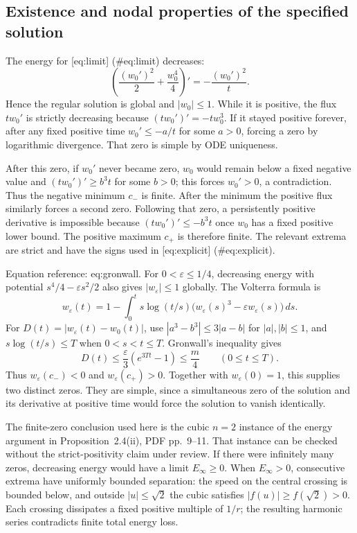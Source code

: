 \documentclass[10pt]{article}
\begin{document}
\subsection*{Existence and nodal properties of the specified solution}
The energy for [eq:limit] (\#eq:limit) decreases: \[\left(\frac{(w_0')^2}{2}+\frac{w_0^4}{4}\right)'
       =-\frac{(w_0')^2}{t}.\] Hence the regular solution is global and \(|w_0|\le1\). While it is positive, the flux \(tw_0'\) is strictly decreasing because \((tw_0')'=-tw_0^3\). If it stayed positive forever, after any fixed positive time \(w_0'\le-a/t\) for some \(a>0\), forcing a zero by logarithmic divergence. That zero is simple by ODE uniqueness.\par
After this zero, if \(w_0'\) never became zero, \(w_0\) would remain below a fixed negative value and \((tw_0')'\ge b^3t\) for some \(b>0\); this forces \(w_0'>0\), a contradiction. Thus the negative minimum \(c_-\) is finite. After the minimum the positive flux similarly forces a second zero. Following that zero, a persistently positive derivative is impossible because \((tw_0')'\le-b^3t\) once \(w_0\) has a fixed positive lower bound. The positive maximum \(c_+\) is therefore finite. The relevant extrema are strict and have the signs used in [eq:explicit] (\#eq:explicit).\par
Equation reference: eq:gronwall. For \(0<\varepsilon\le1/4\), decreasing energy with potential \(s^4/4-\varepsilon s^2/2\) also gives \(|w_\varepsilon|\le1\) globally. The Volterra formula is \[w_\varepsilon(t)=1-\int_0^t s\log(t/s)
              \bigl(w_\varepsilon(s)^3-\varepsilon w_\varepsilon(s)\bigr)\,ds.\] For \(D(t)=|w_\varepsilon(t)-w_0(t)|\), use \(|a^3-b^3|\le3|a-b|\) for \(|a|,|b|\le1\), and \(s\log(t/s)\le T\) when \(0<s<t\le T\). Gronwall’s inequality gives \[
 D(t)\le\frac{\varepsilon}{3}(e^{3Tt}-1)\le\frac m4
       \qquad(0\le t\le T).\] Thus \(w_\varepsilon(c_-)<0\) and \(w_\varepsilon(c_+)>0\). Together with \(w_\varepsilon(0)=1\), this supplies two distinct zeros. They are simple, since a simultaneous zero of the solution and its derivative at positive time would force the solution to vanish identically.\par
The finite-zero conclusion used here is the cubic \(n=2\) instance of the energy argument in Proposition 2.4(ii), PDF pp. 9–11. That instance can be checked without the strict-positivity claim under review. If there were infinitely many zeros, decreasing energy would have a limit \(E_\infty\ge0\). When \(E_\infty>0\), consecutive extrema have uniformly bounded separation: the speed on the central crossing is bounded below, and outside \(|u|\le\sqrt2\) the cubic satisfies \(|f(u)|\ge f(\sqrt2)>0\). Each crossing dissipates a fixed positive multiple of \(1/r\); the resulting harmonic series contradicts finite total energy loss.\par
\end{document}
